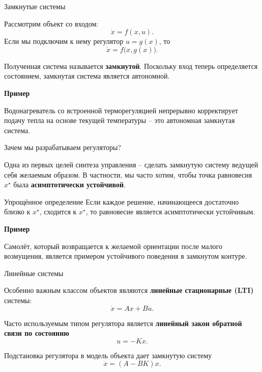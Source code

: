 \documentclass{beamer}
\begin{document}
	\begin{frame}{Замкнутые системы}
		\begin{flushleft}
			
			Рассмотрим объект со входом:
			\[
			\dot{x}=f(x,u).
			\]
			Если мы подключим к нему регулятор \(u=g(x)\), то
			\[
			\dot{x}=f\bigl(x,g(x)\bigr).
			\]
			
			Полученная система называется \textbf{замкнутой}. Поскольку вход теперь определяется состоянием, замкнутая система является автономной.
			
			\bigskip
			
			{
				\textbf{Пример}
				
				Водонагреватель со встроенной терморегуляцией непрерывно корректирует подачу тепла
				на основе текущей температуры -- это автономная замкнутая система.
			}
			
		\end{flushleft}
	\end{frame}
	
	\begin{frame}{Зачем мы разрабатываем регуляторы?}
		\begin{flushleft}
			
			Одна из первых целей синтеза управления -- сделать замкнутую систему
			ведущей себя желаемым образом. В частности, мы часто хотим, чтобы точка равновесия \(x^\star\) была
			\textbf{асимптотически устойчивой}.
			
			\begin{block}{Упрощённое определение}
				Если каждое решение, начинающееся достаточно близко к \(x^\star\), сходится к
				\(x^\star\), то равновесие является асимптотически устойчивым.
			\end{block}
			
			\bigskip
			
			{\mycolor{mydarkblue}
				\textbf{Пример}
				
				Самолёт, который возвращается к желаемой ориентации после малого возмущения,
				является примером устойчивого поведения в замкнутом контуре.
			}
			
		\end{flushleft}
	\end{frame}
	
	\begin{frame}{Линейные системы}
		\begin{flushleft}
			
			Особенно важным классом объектов являются \textbf{линейные стационарные (LTI)}
			системы:
			\[
			\dot{x}=Ax+Bu.
			\]
			
			Часто используемым типом регулятора является \textbf{линейный закон обратной связи по состоянию}
			\[
			u=-Kx.
			\]
			
			Подстановка регулятора в модель объекта дает замкнутую систему
			\[
			\dot{x}=(A-BK)x.
			\]
			
		\end{flushleft}
	\end{frame}
	
\end{document}

